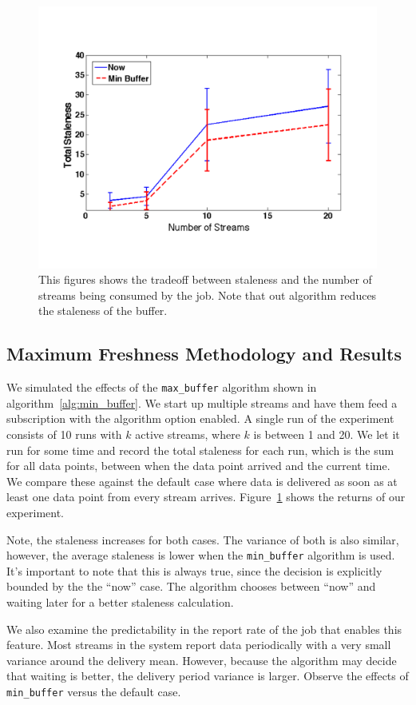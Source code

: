 \begin{figure}[h!] %
\centering
\includegraphics[width=0.75\columnwidth]{figs/staleness_vs_numstreams}
\caption{This figures shows the tradeoff between staleness and the number of streams being consumed by the job.  Note 
that out algorithm reduces the staleness of the buffer.}
\label{fig:stalevsstreams}
\end{figure}

\subsection{Maximum Freshness Methodology and Results}

We simulated the effects of the \texttt{max\_buffer} algorithm shown in algorithm~\ref{alg:min_buffer}.  We start up multiple streams and
have them feed a subscription with the algorithm option enabled.  A single run of the experiment consists of 10 runs with $k$ active streams,
where $k$ is between 1 and 20.  We let it run for some time and record the total staleness for each run, which is the sum for all data points, between
when the data point arrived and the current time.  We compare these against the default case where data is delivered as soon as at least one data point from every stream arrives.  Figure~\ref{fig:stalevsstreams} shows the returns of our experiment.

Note, the staleness increases for both cases.  The variance of both is also similar, however, the average staleness is lower 
when the \texttt{min\_buffer} algorithm is used.  It's important to note that this is always true, since the decision is explicitly
bounded by the the ``now'' case.  The algorithm chooses between ``now'' and waiting later for a better staleness calculation.

We also examine the predictability in the report rate of the job that enables this feature.  Most streams in the system report data periodically
with a very small variance around the delivery mean.  However, because the algorithm may decide that waiting is better, the delivery
period variance is larger.  Observe the effects of \texttt{min\_buffer} versus the default case.

